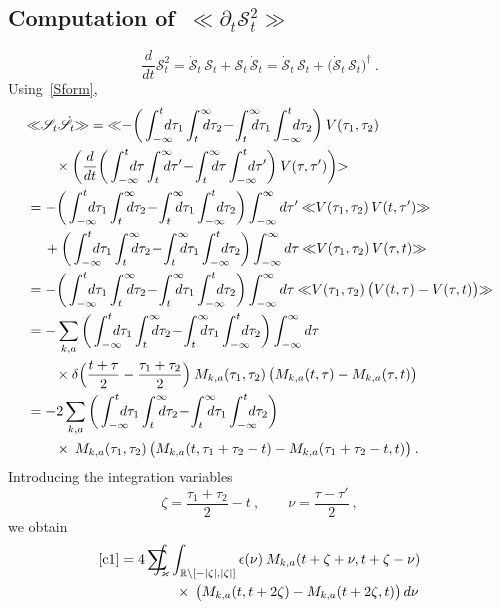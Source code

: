 \documentclass[reqno,11pt]{amsart}
\numberwithin{equation}{section}
\newcommand{\ket}{\mathclose{>}}
\newcommand{\bbra}{\mathopen{\ll}}
\newcommand{\kket}{\mathclose{\gg}}
\newcommand{\R}{\mathbb{R}}
\newcommand{\1}{\mathds{1}}
\newcommand{\Sig}{\mathscr{S}}
\newcommand{\sint}{\sum  \!\!\!\!\!\!\! \int }
\begin{document}
{\subsection{Computation of~$\bbra \partial_t \Sig_t^2 \kket$}  \label{secSS2}
\[ \frac{d}{dt} \Sig_t^2 = \dot{\Sig}_t \,\Sig_t + \Sig_t \,\dot{\Sig}_t
= \dot{\Sig}_t \,\Sig_t + \big( \dot{\Sig}_t\, \Sig_t \big)^\dagger \:. \]
Using~\eqref{Sform},
\begin{align}
&\bbra \Sig_t \dot{\Sig}_t \kket =
\bbra - \bigg( \int_{-\infty}^t \!\!\!\!\!d\tau_1 \int_t^\infty \!\!\!\!\!d\tau_2 \!-\! \int_t^\infty \!\!\!\!\!d\tau_1 \int_{-\infty}^t \!\!\!\!\!d\tau_2 \bigg) \: V(\tau_1,\tau_2) \notag \\
&\qquad \times
\bigg( \frac{d}{dt} \bigg( \int_{-\infty}^t \!\!\!\!\!d\tau \int_t^\infty \!\!\!\!\!d\tau' \!-\! \int_t^\infty \!\!\!\!\!d\tau \int_{-\infty}^t \!\!\!\!\!d\tau' \bigg) \: V(\tau,\tau') \bigg) \ket \notag \\
&=- \bigg( \int_{-\infty}^t \!\!\!\!\!d\tau_1 \int_t^\infty \!\!\!\!\!d\tau_2 \!-\! \int_t^\infty \!\!\!\!\!d\tau_1 \int_{-\infty}^t \!\!\!\!\!d\tau_2 \bigg) \int_{-\infty}^\infty d\tau'\: \bbra V(\tau_1,\tau_2)\,V(t,\tau') \kket \notag \\
&\quad \:+ \bigg( \int_{-\infty}^t \!\!\!\!\!d\tau_1 \int_t^\infty \!\!\!\!\!d\tau_2 \!-\! \int_t^\infty \!\!\!\!\!d\tau_1 \int_{-\infty}^t \!\!\!\!\!d\tau_2 \bigg) \int_{-\infty}^\infty d\tau\:\bbra V(\tau_1,\tau_2) \,V(\tau,t) \kket \notag \\
&=-\bigg( \int_{-\infty}^t \!\!\!\!\!d\tau_1 \int_t^\infty \!\!\!\!\!d\tau_2 \!-\! \int_t^\infty \!\!\!\!\!d\tau_1 \int_{-\infty}^t \!\!\!\!\!d\tau_2 \bigg) \int_{-\infty}^\infty d\tau\: \bbra V(\tau_1,\tau_2)\,\big( V(t,\tau) - V(\tau, t) \big) \kket \notag \\ 
&=-\sum_{k,a} \bigg( \int_{-\infty}^t \!\!\!\!\!d\tau_1 \int_t^\infty \!\!\!\!\!d\tau_2 \!-\! \int_t^\infty \!\!\!\!\!d\tau_1 \int_{-\infty}^t \!\!\!\!\!d\tau_2 \bigg)  \int_{-\infty}^\infty d\tau \notag \\
&\qquad \times \delta \Big(\frac{t+\tau}{2} - \frac{\tau_1+\tau_2}{2} \Big) \: 
M_{k,a}(\tau_1,\tau_2) \, \big( M_{k,a}(t,\tau) - M_{k,a}(\tau, t) \big) \notag \\
&=-2 \sum_{k,a}
\bigg( \int_{-\infty}^t \!\!\!\!\!d\tau_1 \int_t^\infty \!\!\!\!\!d\tau_2 \!-\! \int_t^\infty \!\!\!\!\!d\tau_1 \int_{-\infty}^t \!\!\!\!\!d\tau_2 \bigg) \notag \\
&\qquad \times \: 
M_{k,a}(\tau_1,\tau_2)\,\big( M_{k,a}(t, \tau_1+\tau_2-t) - M_{k,a}(\tau_1+\tau_2-t, t) \big) \:. \label{c1}
\end{align}
Introducing the integration variables
\[ \zeta = \frac{\tau_1+\tau_2}{2} - t \:,\qquad \nu = \frac{\tau-\tau'}{2}\:, \]
we obtain
\begin{align*}
\eqref{c1} &= 4 \sint_\varkappa \int_{\R \setminus [-|\zeta|, |\zeta|]} \epsilon(\nu)\:
M_{k,a}(t+\zeta+ \nu ,t+\zeta-\nu) \\
&\qquad\qquad \times \:\big( M_{k,a}(t, t+2 \zeta) - M_{k,a}(t+2 \zeta, t) \big) \,d\nu
\end{align*}

}
\end{document}
